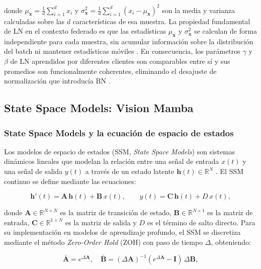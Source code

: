 donde $\mu_{\mathbf{x}} = \frac{1}{d}\sum_{i=1}^d x_i$ y $\sigma^2_{\mathbf{x}} =
\frac{1}{d}\sum_{i=1}^d (x_i - \mu_{\mathbf{x}})^2$ son la media y varianza calculadas sobre
las $d$ características de esa muestra. La propiedad fundamental de LN en el contexto federado
es que las estadísticas $\mu_{\mathbf{x}}$ y $\sigma^2_{\mathbf{x}}$ se calculan de forma
independiente para cada muestra, sin acumular información sobre la distribución del batch ni
mantener estadísticas móviles \cite{casella2023experimentingnormalizationlayersfederated}. En
consecuencia, los parámetros $\gamma$ y $\beta$ de LN aprendidos por diferentes clientes son
comparables entre sí y sus promedios son funcionalmente coherentes, eliminando el desajuste de
normalización que introducía BN \cite{du2022rethinking}.

\subsection{State Space Models: Vision Mamba}

\subsubsection{State Space Models y la ecuación de espacio de estados}

Los modelos de espacio de estados (SSM, \textit{State Space Models}) son sistemas dinámicos
lineales que modelan la relación entre una señal de entrada $x(t)$ y una señal de salida $y(t)$
a través de un estado latente $\mathbf{h}(t) \in \mathbb{R}^N$ \cite{qu2024survey}. El SSM
continuo se define mediante las ecuaciones:

\begin{equation}
  \mathbf{h}'(t) = \mathbf{A}\,\mathbf{h}(t) + \mathbf{B}\,x(t), \qquad
  y(t) = \mathbf{C}\,\mathbf{h}(t) + D\,x(t),
  \label{eq:ssm_cont}
\end{equation}

donde $\mathbf{A} \in \mathbb{R}^{N \times N}$ es la matriz de transición de estado,
$\mathbf{B} \in \mathbb{R}^{N \times 1}$ es la matriz de entrada, $\mathbf{C} \in
\mathbb{R}^{1 \times N}$ es la matriz de salida y $D$ es el término de salto directo.
Para su implementación en modelos de aprendizaje profundo, el SSM se discretiza mediante el
método \textit{Zero-Order Hold} (ZOH) con paso de tiempo $\Delta$, obteniendo:

\begin{equation}
  \bar{\mathbf{A}} = e^{\Delta\mathbf{A}}, \quad
  \bar{\mathbf{B}} = (\Delta\mathbf{A})^{-1}(e^{\Delta\mathbf{A}} - \mathbf{I})\,\Delta\mathbf{B},
  \label{eq:ssm_disc}
\end{equation}

